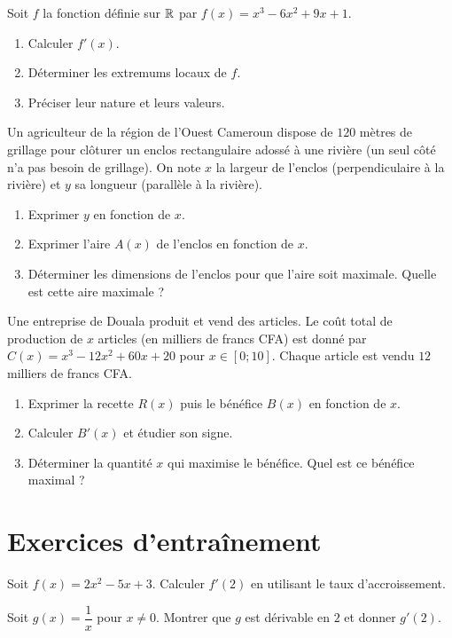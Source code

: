 
\exo{}
Soit $f$ la fonction définie sur $\mathbb{R}$ par $f(x)=x^3-6x^2+9x+1$.
\begin{enumerate}[label=\alph*)]
\item Calculer $f'(x)$.
\item Déterminer les extremums locaux de $f$.
\item Préciser leur nature et leurs valeurs.
\end{enumerate}

\exo{}
Un agriculteur de la région de l'Ouest Cameroun dispose de $120$ mètres de grillage pour clôturer un enclos rectangulaire adossé à une rivière (un seul côté n'a pas besoin de grillage). On note $x$ la largeur de l'enclos (perpendiculaire à la rivière) et $y$ sa longueur (parallèle à la rivière).
\begin{enumerate}[label=\alph*)]
\item Exprimer $y$ en fonction de $x$.
\item Exprimer l'aire $A(x)$ de l'enclos en fonction de $x$.
\item Déterminer les dimensions de l'enclos pour que l'aire soit maximale. Quelle est cette aire maximale ?
\end{enumerate}

\exo{}
Une entreprise de Douala produit et vend des articles. Le coût total de production de $x$ articles (en milliers de francs CFA) est donné par $C(x)=x^3-12x^2+60x+20$ pour $x\in[0;10]$. Chaque article est vendu $12$ milliers de francs CFA.
\begin{enumerate}[label=\alph*)]
\item Exprimer la recette $R(x)$ puis le bénéfice $B(x)$ en fonction de $x$.
\item Calculer $B'(x)$ et étudier son signe.
\item Déterminer la quantité $x$ qui maximise le bénéfice. Quel est ce bénéfice maximal ?
\end{enumerate}

\section{Exercices d'entraînement}


\exo{}
Soit $f(x)=2x^2-5x+3$. Calculer $f'(2)$ en utilisant le taux d'accroissement.

\exo{}
Soit $g(x)=\dfrac{1}{x}$ pour $x\neq0$. Montrer que $g$ est dérivable en $2$ et donner $g'(2)$.

